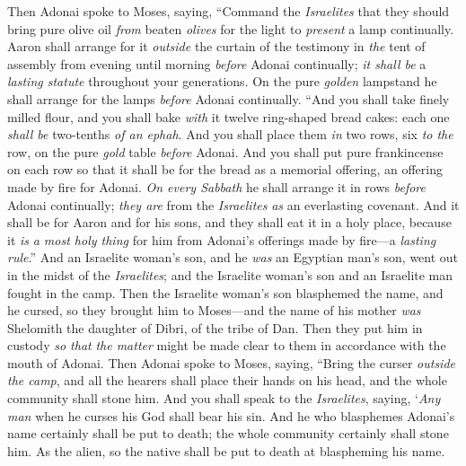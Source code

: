 \begin{biblechapter} %
 Then Adonai spoke to Moses, saying,
\verse “Command the \textit{Israelites} that they should bring pure olive oil \textit{from} beaten \textit{olives} for the light to \textit{present} a lamp continually.
\verse Aaron shall arrange for it \textit{outside} the curtain of the testimony in \textit{the} tent of assembly from evening until morning \textit{before} Adonai continually; \textit{it shall be} a \textit{lasting statute} throughout your generations.
\verse On the pure \textit{golden} lampstand he shall arrange for the lamps \textit{before} Adonai continually.
\verse “And you shall take finely milled flour, and you shall bake \textit{with} it twelve ring-shaped bread cakes: each one \textit{shall be} two-tenths \textit{of an ephah}.
\verse And you shall place them \textit{in} two rows, six \textit{to the} row, on the pure \textit{gold} table \textit{before} Adonai.
\verse And you shall put pure frankincense on each row so that it shall be for the bread as a memorial offering, an offering made by fire for Adonai.
\verse \textit{On every Sabbath} he shall arrange it in rows \textit{before} Adonai continually; \textit{they are} from the \textit{Israelites} \textit{as} an everlasting covenant.
\verse And it shall be for Aaron and for his sons, and they shall eat it in a holy place, because it \textit{is} \textit{a most holy thing} for him from Adonai’s offerings made by fire—a \textit{lasting rule}.”
 And an Israelite woman’s son, and he \textit{was} an Egyptian man’s son, went out in the midst of the \textit{Israelites}; and the Israelite woman’s son and an Israelite man fought in the camp.
\verse Then the Israelite woman’s son blasphemed the name, and he cursed, so they brought him to Moses—and the name of his mother \textit{was} Shelomith the daughter of Dibri, of the tribe of Dan.
\verse Then they put him in custody \textit{so that} \textit{the matter} might be made clear to them in accordance with the mouth of Adonai.
\verse Then Adonai spoke to Moses, saying,
\verse “Bring the curser \textit{outside the camp}, and all the hearers shall place their hands on his head, and the whole community shall stone him.
\verse And you shall speak to the \textit{Israelites}, saying, ‘\textit{Any man} when he curses his God shall bear his sin.
\verse And he who blasphemes Adonai’s name certainly shall be put to death; the whole community certainly shall stone him. As the alien, so the native shall be put to death at blaspheming his name.

\end{biblechapter}
